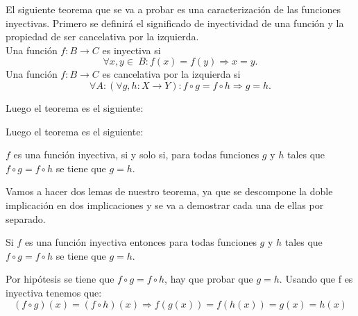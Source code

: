%
\begin{isabellebody}%
%
%
\isadelimtheory
\isanewline
%
\endisadelimtheory
%
\isatagtheory
%
\endisatagtheory
{\isafoldtheory}%
%
\isadelimtheory
%
\endisadelimtheory
%
\isadelimdocument
%
\endisadelimdocument
%
\isatagdocument
%
\isamarkuptrue%
%
\endisatagdocument
{\isafolddocument}%
%
\isadelimdocument
%
\endisadelimdocument
%
\begin{isamarkuptext}%
%
\end{isamarkuptext}\isamarkuptrue%
%
\begin{isamarkuptext}%
%
\end{isamarkuptext}\isamarkuptrue%
%
\begin{isamarkuptext}%
%
\end{isamarkuptext}\isamarkuptrue%
%
\begin{isamarkuptext}%
El siguiente teorema que se va a probar es una caracterización de
 las funciones inyectivas. Primero se definirá el significado de
 inyectividad de una función y la propiedad de ser cancelativa por la
 izquierda. \\
 Una función $f : B \longrightarrow C$ es inyectiva si 
$$\forall x,y \in \ B : f(x) = f(y) \Longrightarrow x =
 y.$$
Una función $f : B \longrightarrow C$ es cancelativa por la izquierda si 
$$\forall A: (\forall g,h: X \longrightarrow Y) : f \circ g = f \circ h
 \Longrightarrow g = h.$$

Luego el teorema es el siguiente:

Luego el teorema es el siguiente:
  
  \begin{teorema}
  $f$ es una función inyectiva, si y solo si, para todas funciones 
 $g$ y $h$  tales que  $f \circ g = f \circ h$ se tiene que $g = h$. 
  \end{teorema}

Vamos a hacer dos lemas de nuestro teorema, ya que se  descompone la
doble implicación en dos implicaciones y se va a  demostrar cada una de
 ellas por  separado.

\begin{lema}
 Si $f$ es una función inyectiva entonces para todas funciones $g$ y $h$
 tales que  $f \circ g = f \circ h$ se tiene que $g = h.$
\end {lema}
  \begin{demostracion}
Por hipótesis se tiene que $f \circ g = f \circ h$, hay que probar que
$g = h$. Usando que f es inyectiva tenemos que: \\
$$(f \circ g)(x) = (f \circ h)(x) \Longrightarrow f(g(x)) = f(h(x)) = 
g(x) = h(x)$$
  \end{demostracion}


\end{isamarkuptext}
\end{isabellebody}
